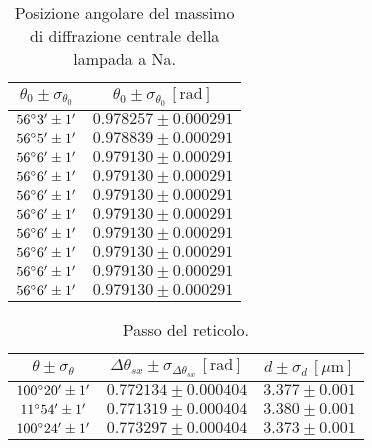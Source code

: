 \documentclass[]{article}
\begin{document}
    \begin{table}[H]
        \centering
        \begin{tabular}{||c|c||}
            \hline
            $\theta_0 \pm \sigma_{\theta_0}$ & $\theta_0 \pm \sigma_{\theta_0} \, \left[\text{rad}\right]$ \\\hline
            \hline
            $56\degree 3' \pm 1'$ & $0.978257 \pm 0.000291$ \\\hline
            $56\degree 5' \pm 1'$ & $0.978839 \pm 0.000291$ \\\hline
            $56\degree 6' \pm 1'$ & $0.979130 \pm 0.000291$ \\\hline
            $56\degree 6' \pm 1'$ & $0.979130 \pm 0.000291$ \\\hline
            $56\degree 6' \pm 1'$ & $0.979130 \pm 0.000291$ \\\hline
            $56\degree 6' \pm 1'$ & $0.979130 \pm 0.000291$ \\\hline
            $56\degree 6' \pm 1'$ & $0.979130 \pm 0.000291$ \\\hline
            $56\degree 6' \pm 1'$ & $0.979130 \pm 0.000291$ \\\hline
            $56\degree 6' \pm 1'$ & $0.979130 \pm 0.000291$ \\\hline
            $56\degree 6' \pm 1'$ & $0.979130 \pm 0.000291$ \\\hline
        \end{tabular}
        \caption{Posizione angolare del massimo di diffrazione centrale della lampada a Na.}
        \label{max-Na}
    \end{table}

    \begin{table}[H]
        \centering
        \begin{tabular}{||c|c|c||}
            \hline
            $\theta \pm \sigma_{\theta}$ & $\Delta\theta_{sx} \pm \sigma_{\Delta\theta_{sx}} \, \left[\text{rad}\right]$ & $d \pm \sigma_d \,\left[\mu\text{m}\right]$ \\\hline
            \hline
            $100\degree 20' \pm 1'$ & $0.772134 \pm 0.000404$ & $3.377 \pm 0.001$ \\\hline
            $ 11\degree 54' \pm 1'$ & $0.771319 \pm 0.000404$ & $3.380 \pm 0.001$ \\\hline
            $100\degree 24' \pm 1'$ & $0.773297 \pm 0.000404$ & $3.373 \pm 0.001$ \\\hline
        \end{tabular}
        \caption{Passo del reticolo.}
        \label{d-Na}
    \end{table}
\end{document}

